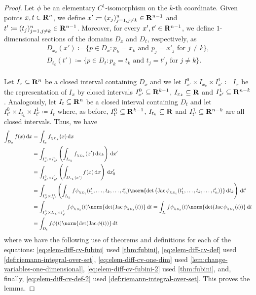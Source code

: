 \begin{proof}
Let \(\phi\) be an elementary \(C^1\)-isomorphism on the \(k\)-th
coordinate. Given points \(x, t \in \mathbf{R}^n\), we define \(x' \coloneq (x_j)_{j=1,
j \neq k}^n \in \mathbf{R}^{n-1}\) and \(t' \coloneq (t_j)_{j=1, j \neq k}^n \in
\mathbf{R}^{n-1}\). Moreover, for every \(x', t' \in \mathbf{R}^{n-1}\), we define
\(1\)-dimensional sections of the domains \(D_x\) and \(D_t\), respectively, as
\begin{gather*}
  D_{x_k}(x') \coloneq
  \{p \in D_x : p_k = x_k \text{ and } p_j = x'_j \text{ for } j \neq k\}, \\
  D_{t_k}(t') \coloneq
  \{p \in D_t : p_k = t_k \text{ and } t_j = t'_j \text{ for } j \neq k\}. \\
\end{gather*}

Let \(I_x \subseteq \mathbf{R}^n\) be a closed interval containing \(D_x\) and we let
\(I_{x'}^0 \times I_{x_k} \times I_{x'}^1 \coloneq I_x\) be the representation
of \(I_x\) by closed intervals \(I_{x'}^0 \subseteq \mathbf{R}^{k-1}\), \(I_{x_k}
\subseteq \mathbf{R}\) and \(I_{x'}^1 \subseteq \mathbf{R}^{n-k}\). Analogously, let \(I_t
\subseteq \mathbf{R}^n\) be a closed interval containing \(D_t\) and let \(I_{t'}^0
\times I_{t_k} \times I_{t'}^1 \coloneq I_t\) where, as before, \(I_{t'}^0
\subseteq \mathbf{R}^{k-1}\), \(I_{t_k} \subseteq \mathbf{R}\) and \(I_{t'}^1 \subseteq
\mathbf{R}^{n-k}\) are all closed intervals. Thus, we have
\begin{align}
  \nonumber
  \int_{D_x} f(x)\, \diff x
  &= \int_{I_x} f_{\chi_{D_x}}(x)\, \diff x \\
  \label{eq:elem-diff-cv-fubini}
  &= \int_{I_{x'}^0 \times I_{x'}^1} \left(
  \int_{I_{x_k}} f_{\chi_{D_x}}(x')\, \diff x_k
  \right)\, \diff x' \\
  \label{eq:elem-diff-cv-def}
  &= \int_{I_{x'}^0 \times I_{x'}^1} \left(
    \int_{D_{x_k}(x')} f(x)\, \diff x
    \right)\, \diff x_0' \\
  \label{eq:elem-diff-cv-one-dim}
  &= \int_{I_{t'}^0 \times I_{t'}^1} \left(
    \int_{I_{t_k}} f\phi_{\chi_{D_t}}(t_1', \dots, t_k, \dots, t_n')
    \norm{\det\left( \Jac \phi_{\chi_{D_t}}(t_1', \dots, t_k, \dots, t_n')
    \right)}\, \diff t_k \right)\, \diff t' \\
  \label{eq:elem-diff-cv-fubini-2}
  &= \int_{I_{t'}^0 \times I_{t_k} \times I_{t'}^1}
    f \phi_{\chi_{D_t}}(t) \norm{\det(\Jac \phi_{\chi_{D_t}}(t))}\, \diff t
  = \int_{I_t}
    f \phi_{\chi_{D_t}}(t) \norm{\det(\Jac \phi_{\chi_{D_t}}(t))}\, \diff t
  \\
  \label{eq:elem-diff-cv-def-2}
  &= \int_{D_t} f \phi(t) \norm{\det(\Jac \phi(t))}\, \diff t
\end{align}
where we have the following use of theorems and definitions for each of the
equations: \cref{eq:elem-diff-cv-fubini} used \cref{thm:fubini},
\cref{eq:elem-diff-cv-def} used \cref{def:riemann-integral-over-set},
\cref{eq:elem-diff-cv-one-dim} used \cref{lem:change-variables-one-dimensional},
\cref{eq:elem-diff-cv-fubini-2} used \cref{thm:fubini}, and, finally,
\cref{eq:elem-diff-cv-def-2} used \cref{def:riemann-integral-over-set}. This
proves the lemma.
\end{proof}

